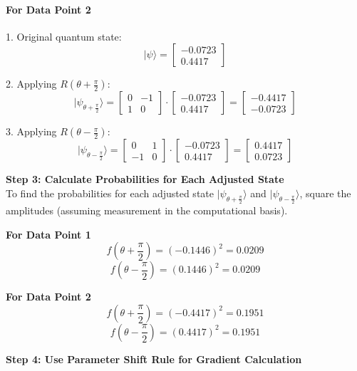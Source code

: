 \documentclass[a4paper]{article}
\begin{document}
\paragraph{For Data Point 2}
1. Original quantum state:
\[| \psi \rangle = \begin{bmatrix} -0.0723 \\ 0.4417 \end{bmatrix}\]

2. Applying \( R(\theta + \frac{\pi}{2}) \):
\[| \psi_{\theta + \frac{\pi}{2}} \rangle = \begin{bmatrix} 0 & -1 \\ 1 & 0 \end{bmatrix} \cdot \begin{bmatrix} -0.0723 \\ 0.4417 \end{bmatrix} = \begin{bmatrix} -0.4417 \\ -0.0723 \end{bmatrix}\]

3. Applying \( R(\theta - \frac{\pi}{2}) \):
\[| \psi_{\theta - \frac{\pi}{2}} \rangle = \begin{bmatrix} 0 & 1 \\ -1 & 0 \end{bmatrix} \cdot \begin{bmatrix} -0.0723 \\ 0.4417 \end{bmatrix} = \begin{bmatrix} 0.4417 \\ 0.0723 \end{bmatrix}\]

\textbf{Step 3: Calculate Probabilities for Each Adjusted State} \\

\noindent To find the probabilities for each adjusted state \( | \psi_{\theta + \frac{\pi}{2}} \rangle \) and \( | \psi_{\theta - \frac{\pi}{2}} \rangle \), square the amplitudes (assuming measurement in the computational basis).

\textbf{For Data Point 1}
\[f\left(\theta + \frac{\pi}{2}\right) = (-0.1446)^2 = 0.0209\]
\[f\left(\theta - \frac{\pi}{2}\right) = (0.1446)^2 = 0.0209\]

\textbf{For Data Point 2}
\[f\left(\theta + \frac{\pi}{2}\right) = (-0.4417)^2 = 0.1951\]
\[f\left(\theta - \frac{\pi}{2}\right) = (0.4417)^2 = 0.1951\]

\textbf{Step 4: Use Parameter Shift Rule for Gradient Calculation}
\end{document}
